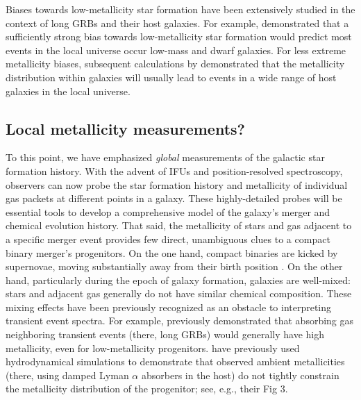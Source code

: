 \documentclass[nofootinbib,twocolumn,prd]{emulateapj}
\begin{document}
Biases towards low-metallicity star formation have been extensively studied in the context of long GRBs and their host galaxies.
%
For example, \cite{2009ApJ...702..377K} demonstrated that a sufficiently strong bias towards low-metallicity star formation would predict
most  events in the local universe occur low-mass and dwarf galaxies.
For less extreme metallicity biases, subsequent calculations by  \citet{2011MNRAS.417..567N} demonstrated that the
metallicity distribution within galaxies will usually lead to events in a wide range of host galaxies in the local universe.

\subsection{Local metallicity measurements?}
To this point, we have emphasized \emph{global} measurements of the galactic star formation history.  With the advent of
IFUs and position-resolved spectroscopy, observers can now probe the star formation history and metallicity of
individual gas packets at different points in a galaxy.  
%
These highly-detailed probes will be essential tools to develop a comprehensive model of the galaxy's merger and
chemical evolution history.  That said, the metallicity of stars and gas adjacent to a specific merger event provides
few direct, unambiguous clues to a compact binary merger's progenitors.  
On the one hand, compact binaries are kicked by supernovae, moving substantially away from their birth position
\cite{2013ApJ...776...18F,2014ARAA..52...43B}. 
On the other hand, particularly during the epoch of galaxy formation, galaxies are well-mixed: stars and adjacent gas generally do not have
similar chemical composition.  
These mixing effects have been previously recognized as an obstacle to interpreting transient event spectra.  For
example,   \cite{2010MNRAS.402.1523P} previously demonstrated that absorbing gas neighboring transient events (there, long GRBs)
would generally have high metallicity, even for low-metallicity progenitors.   
%
\citet{2010MNRAS.402.1523P} have previously used hydrodynamical simulations to demonstrate that observed ambient
metallicities (there, using damped Lyman $\alpha$ absorbers in the host) do not tightly constrain the metallicity
distribution of the progenitor; see, e.g., their Fig 3.
%
\end{document}
